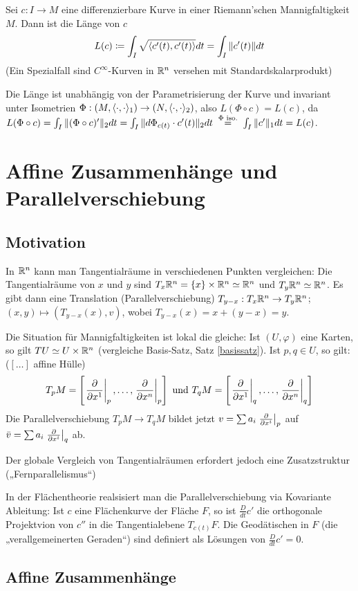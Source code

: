 \documentclass[a4paper,twoside,DIV15,BCOR12mm]{scrbook}
\renewcommand{\da}{\coloneqq}
\begin{document}
Sei $c: I \to M$ eine differenzierbare Kurve in einer Riemann’schen Mannigfaltigkeit $M$. Dann ist die Länge von $c$
\[
L(c) \da \int_I \sqrt{\ksp {c'(t)}{c'(t)}}dt  = \int _I \|c'(t)\|dt
\]
(Ein Spezialfall sind $C^\infty$-Kurven in $\mathbb{R}^n$ versehen mit Standardskalarprodukt)

Die Länge ist unabhängig von der Parametrisierung der Kurve und invariant unter Isometrien $\Phi : (M,\langle\cdot,\cdot\rangle_1) \to (N,\langle\cdot,\cdot\rangle_2)$, also $L(\Phi \circ c) = L(c)$, da $L(\Phi \circ c) = \int_I\|(\Phi \circ c)'\|_2dt = \int_I\|d\Phi_{c(t)}\cdot c'(t)\|_2dt \gleichnach{$\Phi$ iso.} \int_I\|c'\|_1dt = L(c)$.


\chapter{Affine Zusammenhänge und Parallelverschiebung}

\section{Motivation}

In $\mathbb{R}^n$ kann man Tangentialräume in verschiedenen Punkten vergleichen:
Die Tangentialräume von $x$ und $y$ sind $T_x\mathbb{R}^n = \{x\}\times \mathbb{R}^n \simeq \mathbb{R}^n$ und $T_y\mathbb{R}^n \simeq \mathbb{R}^n$. Es gibt dann eine Translation (Parallelverschiebung) $T_{y-x}:T_x\mathbb{R}^n \to T_y\mathbb{R}^n$; $(x,y)\mapsto (T_{y-x}(x), v)$, wobei $T_{y-x}(x) = x + (y-x) = y$.

Die Situation für Mannigfaltigkeiten ist lokal die gleiche: Ist $(U,\varphi)$ eine Karten, so gilt $TU \simeq U\times\mathbb{R}^n$ (vergleiche Basis-Satz, Satz \ref{basissatz}). Ist $p,q\in U$, so gilt: ($[\ldots]$ affine Hülle)
\[ T_pM = \left[ \left.\frac{\partial}{\partial x^{1}}\right|_p,\ldots, \left.\frac{\partial}{\partial x^{n}}\right|_p \right] \text{ und } T_qM = \left[ 
\left.\frac{\partial}{\partial x^{1}}\right|_q ,\ldots, \left.\frac{\partial}{\partial x^{n}}\right|_q
 \right] \]
 Die Parallelverschiebung $T_pM \to T_qM$ bildet jetzt 
$v=\sum a_i \left.\frac{\partial}{\partial x^{i}}\right|_p$ auf $\bar v = \sum a_i \left.\frac{\partial}{\partial x^{i}}\right|_q$ ab.

Der globale Vergleich von Tangentialräumen erfordert jedoch eine Zusatzstruktur („Fernparallelismus“)

In der Flächentheorie realsisiert man die Parallelverschiebung via Kovariante Ableitung: Ist $c$ eine Flächenkurve der Fläche $F$, so ist $\frac D {dt} c'$ die orthogonale Projektvion von $c''$  in die Tangentialebene $T_{c(t)}F$. Die Geodätischen in $F$ (die „verallgemeinerten Geraden“) sind definiert als Lösungen von $\frac D {dt} c' = 0$.

\section{Affine Zusammenhänge}
\end{document}
